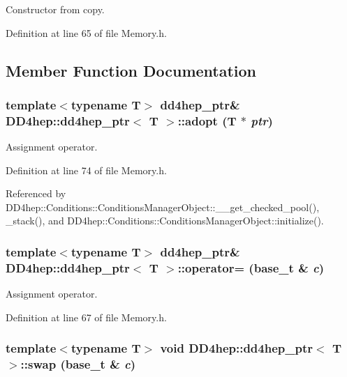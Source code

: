 Constructor from copy. 

Definition at line 65 of file Memory.h.

\subsection{Member Function Documentation}
\hypertarget{class_d_d4hep_1_1dd4hep__ptr_aa6519c1c4d2d455b6b5cfad3318d5cc9}{
\subsubsection[{adopt}]{\setlength{\rightskip}{0pt plus 5cm}template$<$typename T$>$ {\bf dd4hep\_\-ptr}\& {\bf DD4hep::dd4hep\_\-ptr}$<$ {\bf T} $>$::adopt ({\bf T} $\ast$ {\em ptr})}}
\label{class_d_d4hep_1_1dd4hep__ptr_aa6519c1c4d2d455b6b5cfad3318d5cc9}


Assignment operator. 

Definition at line 74 of file Memory.h.

Referenced by DD4hep::Conditions::ConditionsManagerObject::\_\-\_\-get\_\-checked\_\-pool(), \_\-stack(), and DD4hep::Conditions::ConditionsManagerObject::initialize().\hypertarget{class_d_d4hep_1_1dd4hep__ptr_a08249cfe600aa0ad78b8871db6df8b4f}{
\subsubsection[{operator=}]{\setlength{\rightskip}{0pt plus 5cm}template$<$typename T$>$ {\bf dd4hep\_\-ptr}\& {\bf DD4hep::dd4hep\_\-ptr}$<$ {\bf T} $>$::operator= ({\bf base\_\-t} \& {\em c})}}
\label{class_d_d4hep_1_1dd4hep__ptr_a08249cfe600aa0ad78b8871db6df8b4f}


Assignment operator. 

Definition at line 67 of file Memory.h.\hypertarget{class_d_d4hep_1_1dd4hep__ptr_a9545ee3f6465afeefd98336c176529dd}{
\subsubsection[{swap}]{\setlength{\rightskip}{0pt plus 5cm}template$<$typename T$>$ void {\bf DD4hep::dd4hep\_\-ptr}$<$ {\bf T} $>$::swap ({\bf base\_\-t} \& {\em c})}}
\label{class_d_d4hep_1_1dd4hep__ptr_a9545ee3f6465afeefd98336c176529dd}


